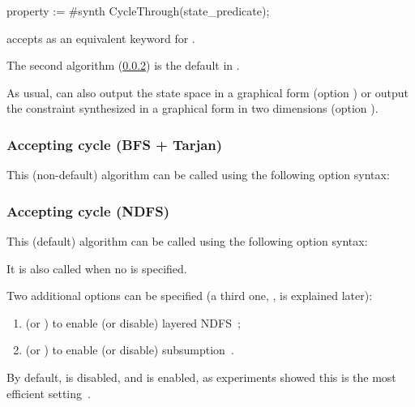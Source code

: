 \begin{IMITATORproperty}
property := #synth CycleThrough(state_predicate);
\end{IMITATORproperty}

\begin{syntaxalias}
	\imitator{} accepts  as an equivalent keyword for .
\end{syntaxalias}



The second algorithm (\cref{sss:accepting-loop-NDFS}) is the default in \imitator{}.


As usual, \imitator{} can also
output the state space in a graphical form (option )
or
output the constraint synthesized in a graphical form in two dimensions (option ).


\subsubsection{Accepting cycle (BFS + Tarjan)}\label{sss:accepting-loop-BFS}

This (non-default) algorithm can be called using the following option syntax:



\subsubsection{Accepting cycle (NDFS)}\label{sss:accepting-loop-NDFS}

This (default) algorithm can be called using the following option syntax:


It is also called when no  is specified.

Two additional options can be specified (a third one, , is explained later):
\begin{enumerate}
	\item {} (or ) to enable (or disable) layered NDFS~\cite{NPP18};
	\item {} (or ) to enable (or disable) subsumption~\cite{NPP18}.
\end{enumerate}
By default,  is disabled, and  is enabled, as experiments showed this is the most efficient setting~\cite{NPP18}.

